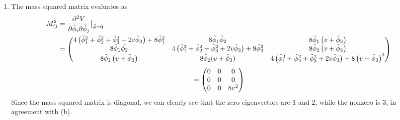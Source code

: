 \documentclass[12pt]{article}
\begin{document}
\begin{enumerate}[label=(\alph*)]
    \item The mass squared matrix evaluates as 
    {\tiny
    \begin{align*}
        M_{ij}^2 &= \pdv[2]{V}{\tilde{\phi}_i}{\tilde{\phi}_j}\big|_{\tilde{\phi}=0} \\
        &= \mqty(4\left(\tilde{\phi}_1^2 + \tilde{\phi}_2^2 + \tilde{\phi}_3^2 + 2v\tilde{\phi}_3\right) + 8\tilde{\phi}_1^2 & 8\tilde{\phi}_1\tilde{\phi}_2 & 8\tilde{\phi}_1\left(v + \tilde{\phi}_3\right) \\
                 8\tilde{\phi}_1\tilde{\phi_2} & 4\left(\tilde{\phi}_1^2 + \tilde{\phi}_2^2 + \tilde{\phi}_3^2 + 2v\tilde{\phi}_3\right) + 8\tilde{\phi}_2^2 & 8\tilde{\phi}_2\left(v + \tilde{\phi}_3\right) \\
                 8\tilde{\phi}_1\left(v + \tilde{\phi}_3\right) & 8\tilde{\phi}_2(v + \tilde{\phi}_3) & 4\left(\tilde{\phi}_1^2 + \tilde{\phi}_2^2 + \tilde{\phi}_3^2 + 2v\tilde{\phi}_3\right) + 8\left(v + \tilde{\phi}_3\right)^2 )\\
    \end{align*}
    }%
    \[ = \mqty(0&0&0\\0&0&0\\0&0&8v^2) \]
    Since the mass squared matrix is diagonal, we can clearly see that the zero eigenvectors are 1 and 2, while the nonzero is 3, in agreement with (b).
\end{enumerate}
\end{document}
